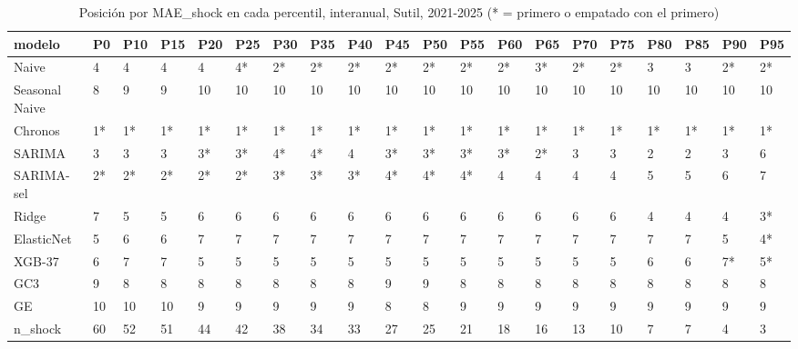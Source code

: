 \begin{table}[H]
\centering
\small
\caption{Posición por MAE\_shock en cada percentil, interanual, Sutil, 2021-2025 (* = primero o empatado con el primero)}
\label{tab:T_barrido_posiciones_interanual_sutil}
\begin{tabular}{llllllllllllllllllll}
\toprule
modelo & P0 & P10 & P15 & P20 & P25 & P30 & P35 & P40 & P45 & P50 & P55 & P60 & P65 & P70 & P75 & P80 & P85 & P90 & P95 \\
\midrule
Naive & 4 & 4 & 4 & 4 & 4* & 2* & 2* & 2* & 2* & 2* & 2* & 2* & 3* & 2* & 2* & 3 & 3 & 2* & 2* \\
Seasonal Naive & 8 & 9 & 9 & 10 & 10 & 10 & 10 & 10 & 10 & 10 & 10 & 10 & 10 & 10 & 10 & 10 & 10 & 10 & 10 \\
Chronos & 1* & 1* & 1* & 1* & 1* & 1* & 1* & 1* & 1* & 1* & 1* & 1* & 1* & 1* & 1* & 1* & 1* & 1* & 1* \\
SARIMA & 3 & 3 & 3 & 3* & 3* & 4* & 4* & 4 & 3* & 3* & 3* & 3* & 2* & 3 & 3 & 2 & 2 & 3 & 6 \\
SARIMA-sel & 2* & 2* & 2* & 2* & 2* & 3* & 3* & 3* & 4* & 4* & 4* & 4 & 4 & 4 & 4 & 5 & 5 & 6 & 7 \\
Ridge & 7 & 5 & 5 & 6 & 6 & 6 & 6 & 6 & 6 & 6 & 6 & 6 & 6 & 6 & 6 & 4 & 4 & 4 & 3* \\
ElasticNet & 5 & 6 & 6 & 7 & 7 & 7 & 7 & 7 & 7 & 7 & 7 & 7 & 7 & 7 & 7 & 7 & 7 & 5 & 4* \\
XGB-37 & 6 & 7 & 7 & 5 & 5 & 5 & 5 & 5 & 5 & 5 & 5 & 5 & 5 & 5 & 5 & 6 & 6 & 7* & 5* \\
GC3 & 9 & 8 & 8 & 8 & 8 & 8 & 8 & 8 & 9 & 9 & 8 & 8 & 8 & 8 & 8 & 8 & 8 & 8 & 8 \\
GE & 10 & 10 & 10 & 9 & 9 & 9 & 9 & 9 & 8 & 8 & 9 & 9 & 9 & 9 & 9 & 9 & 9 & 9 & 9 \\
n\_shock & 60 & 52 & 51 & 44 & 42 & 38 & 34 & 33 & 27 & 25 & 21 & 18 & 16 & 13 & 10 & 7 & 7 & 4 & 3 \\
\bottomrule
\end{tabular}
\end{table}